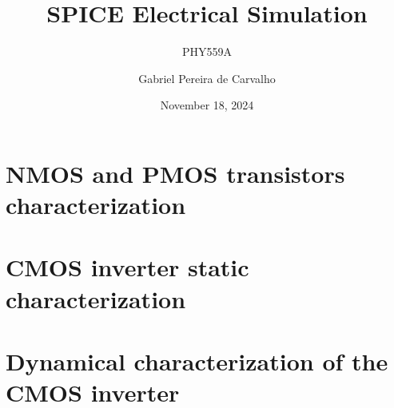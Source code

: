 \documentclass[a4paper,12pt,twoside]{article}
\title{SPICE Electrical Simulation}
\subtitle{PHY559A}
\author{Gabriel Pereira de Carvalho}
\date{November 18, 2024}
\begin{document}
\maketitle

\tableofcontents

\newpage

\section{NMOS and PMOS transistors characterization}
{
	
	
}
\section{CMOS inverter static characterization}
{
	
	
	
}
\section{Dynamical characterization of the CMOS inverter}
{
	
	
	
}
\end{document}
